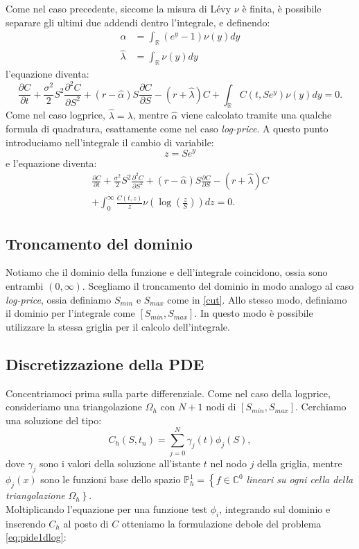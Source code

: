 \documentclass[a4paper,10pt]{report}
\newcommand{\der}[2]{\frac{\partial #1}{\partial #2}}
\newcommand{\dder}[2]{\frac{\partial^2 #1}{\partial #2^2}}
\theoremstyle{plain}
\theoremstyle{definition}
\theoremstyle{remark}
\begin{document}
Come nel caso precedente, siccome la misura di Lévy $\nu$ è finita, è possibile separare gli ultimi due addendi dentro l'integrale, e definendo:
\begin{align*}
 \hat{\alpha}&=\int_\mathbb{R}(e^y-1)\nu(y)dy \\
 \hat{\lambda}&=\int_\mathbb{R}\nu(y)dy
\end{align*}
l'equazione diventa:
\begin{equation*}
\der{C}{t}+\frac{\sigma^2}{2}S^2\dder{C}{S}+(r-\hat{\alpha})S\der{C}{S}-(r+\hat{\lambda})C+ \int_\mathbb{R}C(t,Se^y)\nu(y)dy=0.
\end{equation*}
Come nel caso logprice, $\hat{\lambda}=\lambda$, mentre $\hat{\alpha}$ viene calcolato tramite una qualche formula di quadratura, esattamente come nel caso \emph{log-price}. A questo punto introduciamo nell'integrale il cambio di variabile:
\begin{equation*}
 z=Se^y
\end{equation*}
e l'equazione diventa:
\begin{multline}
\label{eq:PIDEinPrice}
\der{C}{t}+\frac{\sigma^2}{2}S^2\dder{C}{S}+(r-\hat{\alpha})S\der{C}{S}-(r+\hat{\lambda})C\\+\int_0^\infty \frac{C(t,z)}{z}\nu\left(\log\left(\frac{z}{S}\right) \right)dz=0.
\end{multline}

\subsection{Troncamento del dominio}

Notiamo che il dominio della funzione e dell'integrale coincidono, ossia sono entrambi $(0,\infty)$.
Scegliamo il troncamento del dominio in modo analogo al caso \emph{log-price}, ossia definiamo $S_{min}$ e $S_{max}$ come in \eqref{cut}. Allo stesso modo, definiamo il dominio per l'integrale come $[S_{min},S_{max}]$. In questo modo è possibile utilizzare la stessa griglia per il calcolo dell'integrale.

\subsection{Discretizzazione della PDE}
Concentriamoci prima sulla parte differenziale. Come nel caso della logprice, consideriamo una triangolazione $\Omega_h$ con $N+1$ nodi di $[S_{min},S_{max}]$. Cerchiamo una soluzione del tipo: $$C_h(S,t_n)=\sum_{j=0}^{N}\gamma_j(t)\phi_j(S),$$ dove $\gamma_j$ sono i valori della soluzione all'istante $t$ nel nodo $j$ della griglia, mentre $\phi_j(x)$ sono le funzioni base dello spazio $\mathbb{P}_h^1=\left\{f\in\mathbb{C}^0\right.$ \emph{lineari su ogni cella della triangolazione} $\Omega_h\left.\right\}$.\\
Moltiplicando l'equazione per una funzione test $\phi_i$, integrando sul dominio e inserendo $C_h$ al posto di $C$ otteniamo la formulazione debole del problema \eqref{eq:pide1dlog}:
\end{document}
